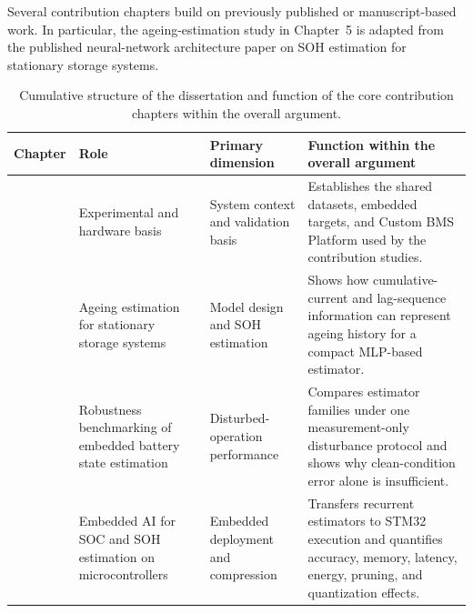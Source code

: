 \documentclass[
    a4paper,
    12pt,
    titlepage,
    bibliography=totoc,
    twoside=on,
    parskip=false,
    numbers=noenddot,
    cleardoublepage=empty,
    DIV=12,
    BCOR=12.0mm,
    headheight=36pt,
    headings=openright
]{scrreprt}
\begin{document}
Several contribution chapters build on previously published or manuscript-based work. In particular, the ageing-estimation study in Chapter~5 is adapted from the published neural-network architecture paper on SOH estimation for stationary storage systems.\autocite{rzepkaNeuralNetworkArchitecture2023a}

\begin{table}[p]
    \centering
    \small
    \setlength{\tabcolsep}{4pt}
    \renewcommand{\arraystretch}{0.96}
    \caption[Dissertation structure and chapter roles.]{Cumulative structure of the dissertation and function of the core contribution chapters within the overall argument.}
    \label{tab:publication_map}
    \begin{tabularx}{\textwidth}{>{\raggedright\arraybackslash}p{1.8cm}>{\raggedright\arraybackslash}p{5.3cm}>{\raggedright\arraybackslash}p{2.7cm}>{\raggedright\arraybackslash}X}
        \toprule
        Chapter & Role & Primary dimension & Function within the overall argument \\
        \midrule
        4 & Experimental and hardware basis & System context and validation basis & Establishes the shared datasets, embedded targets, and Custom BMS Platform used by the contribution studies. \\
        5 & Ageing estimation for stationary storage systems & Model design and SOH estimation & Shows how cumulative-current and lag-sequence information can represent ageing history for a compact MLP-based estimator. \\
        6 & Robustness benchmarking of embedded battery state estimation & Disturbed-operation performance & Compares estimator families under one measurement-only disturbance protocol and shows why clean-condition error alone is insufficient. \\
        7 & Embedded AI for SOC and SOH estimation on microcontrollers & Embedded deployment and compression & Transfers recurrent estimators to STM32 execution and quantifies accuracy, memory, latency, energy, pruning, and quantization effects. \\
        \bottomrule
    \end{tabularx}
\end{table}
\end{document}
